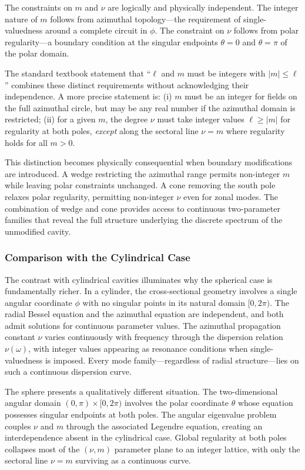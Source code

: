 \documentclass[
  aip,
  amsmath,amssymb,
  preprint
]{revtex4-1}
\begin{document}
The constraints on $m$ and $\nu$ are logically and physically independent. The integer nature of $m$ follows from azimuthal topology---the requirement of single-valuedness around a complete circuit in $\phi$. The constraint on $\nu$ follows from polar regularity---a boundary condition at the singular endpoints $\theta = 0$ and $\theta = \pi$ of the polar domain.

The standard textbook statement that ``$\ell$ and $m$ must be integers with $|m| \leq \ell$'' combines these distinct requirements without acknowledging their independence. A more precise statement is: (i) $m$ must be an integer for fields on the full azimuthal circle, but may be any real number if the azimuthal domain is restricted; (ii) for a given $m$, the degree $\nu$ must take integer values $\ell \geq |m|$ for regularity at both poles, \textit{except} along the sectoral line $\nu = m$ where regularity holds for all $m > 0$.

This distinction becomes physically consequential when boundary modifications are introduced. A wedge restricting the azimuthal range permits non-integer $m$ while leaving polar constraints unchanged. A cone removing the south pole relaxes polar regularity, permitting non-integer $\nu$ even for zonal modes. The combination of wedge and cone provides access to continuous two-parameter families that reveal the full structure underlying the discrete spectrum of the unmodified cavity.

\subsubsection{Comparison with the Cylindrical Case}

The contrast with cylindrical cavities illuminates why the spherical case is fundamentally richer. In a cylinder, the cross-sectional geometry involves a single angular coordinate $\phi$ with no singular points in its natural domain $[0, 2\pi)$. The radial Bessel equation and the azimuthal equation are independent, and both admit solutions for continuous parameter values. The azimuthal propagation constant $\nu$ varies continuously with frequency through the dispersion relation $\nu(\omega)$, with integer values appearing as resonance conditions when single-valuedness is imposed. Every mode family---regardless of radial structure---lies on such a continuous dispersion curve.

The sphere presents a qualitatively different situation. The two-dimensional angular domain $(0,\pi) \times [0, 2\pi)$ involves the polar coordinate $\theta$ whose equation possesses singular endpoints at both poles. The angular eigenvalue problem couples $\nu$ and $m$ through the associated Legendre equation, creating an interdependence absent in the cylindrical case. Global regularity at both poles collapses most of the $(\nu, m)$ parameter plane to an integer lattice, with only the sectoral line $\nu = m$ surviving as a continuous curve.
\end{document}
